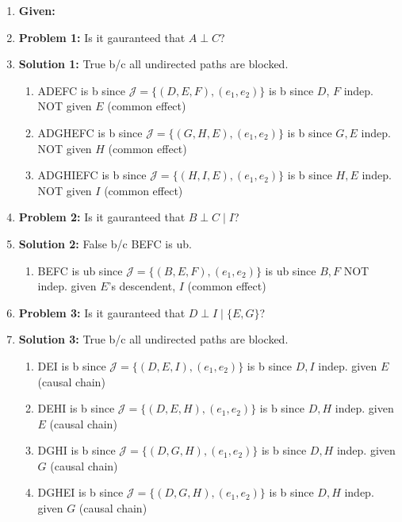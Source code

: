 \begin{example}
    \begin{enumerate}
        \item \textbf{Given:}
        \item \textbf{Problem 1:} Is it gauranteed that $A \perp C$?
        \item \textbf{Solution 1:} True b/c all undirected paths are blocked.
        \begin{enumerate}
            \item ADEFC is b since $\mathcal{J} = \{(D,E,F),(e_1,e_2)\}$ is b since $D$, $F$ indep. NOT given $E$ (common effect)
            \item ADGHEFC is b since $\mathcal{J} = \{(G,H,E),(e_1,e_2)\}$ is b since $G,E$ indep. NOT given $H$ (common effect)
            \item ADGHIEFC is b since $\mathcal{J} = \{(H,I,E),(e_1,e_2)\}$ is b since $H,E$ indep. NOT given $I$ (common effect)
        \end{enumerate}
        \vspace{1em}
        \item \textbf{Problem 2:} Is it gauranteed that $B \perp C \mid I$?
        \item \textbf{Solution 2:} False b/c BEFC is ub. 
        \begin{enumerate}
            \item BEFC is ub since $\mathcal{J} = \{(B,E,F),(e_1,e_2)\}$ is ub since $B,F$ NOT indep. given $E$'s descendent, $I$ (common effect)
        \end{enumerate}
        \vspace{1em}
        \item \textbf{Problem 3:} Is it gauranteed that $D \perp I \mid \{E,G\}$?
        \item \textbf{Solution 3:} True b/c all undirected paths are blocked.
        \begin{enumerate}
            \item DEI is b since $\mathcal{J} = \{(D,E,I),(e_1,e_2)\}$ is b since $D,I$ indep. given $E$ (causal chain)
            \item DEHI is b since $\mathcal{J} = \{(D,E,H),(e_1,e_2)\}$ is b since $D,H$ indep. given $E$ (causal chain)
            \item DGHI is b since $\mathcal{J} = \{(D,G,H),(e_1,e_2)\}$ is b since $D,H$ indep. given $G$ (causal chain)
            \item DGHEI is b since $\mathcal{J} = \{(D,G,H),(e_1,e_2)\}$ is b since $D,H$ indep. given $G$ (causal chain)

\end{enumerate}
\end{enumerate}
\end{example}
